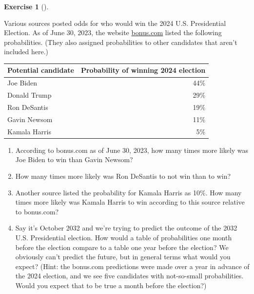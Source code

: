 \documentclass[
  letterpaper,
  DIV=11,
  numbers=noendperiod]{scrreprt}
\providecommand{\tightlist}{%
  \setlength{\itemsep}{0pt}\setlength{\parskip}{0pt}}
\theoremstyle{plain}
\theoremstyle{definition}
\theoremstyle{definition}
\newtheorem{exercise}{Exercise}[chapter]
\theoremstyle{definition}
\theoremstyle{remark}
\begin{document}
\begin{exercise}[]\protect\hypertarget{exr-interpret-subjective}{}\label{exr-interpret-subjective}

Various sources posted odds for who would win the 2024 U.S. Presidential
Election. As of June 30, 2023, the website
\href{https://www.bonus.com/election/}{bonus.com} listed the following
probabilities. (They also assigned probabilities to other candidates
that aren't included here.)

\begin{longtable}[]{@{}lr@{}}
\toprule\noalign{}
Potential candidate & Probability of winning 2024 election \\
\midrule\noalign{}
\endhead
\bottomrule\noalign{}
\endlastfoot
Joe Biden & 44\% \\
Donald Trump & 29\% \\
Ron DeSantis & 19\% \\
Gavin Newsom & 11\% \\
Kamala Harris & 5\% \\
\end{longtable}

\begin{enumerate}
\def\labelenumi{\arabic{enumi}.}
\tightlist
\item
  According to bonus.com as of June 30, 2023, how many times more likely
  was Joe Biden to win than Gavin Newsom?
\item
  How many times more likely was Ron DeSantis to not win than to win?
\item
  Another source listed the probability for Kamala Harris as 10\%. How
  many times more likely was Kamala Harris to win according to this
  source relative to bonus.com?
\item
  Say it's October 2032 and we're trying to predict the outcome of the
  2032 U.S. Presidential election. How would a table of probabilities
  one month before the election compare to a table one year before the
  election? We obviously can't predict the future, but in general terms
  what would you expect? (Hint: the bonus.com predictions were made over
  a year in advance of the 2024 election, and we see five candidates
  with not-so-small probabilities. Would you expect that to be true a
  month before the election?)
\end{enumerate}

\end{exercise}
\end{document}
